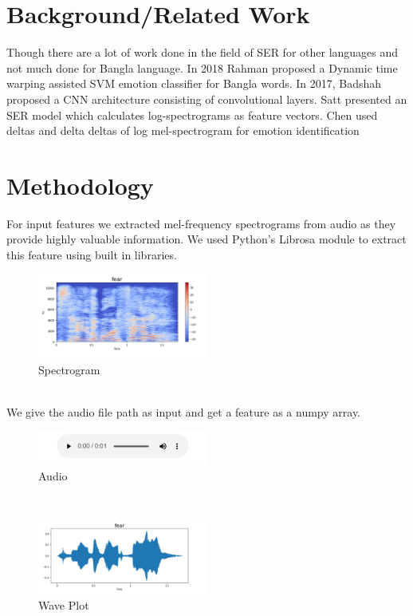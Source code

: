 \documentclass[a4paper, 12pt]{report}
\begin{document}
\section{Background/Related Work}
Though there are a lot of work done in the field of SER for other languages and not much done for Bangla language. In 2018 Rahman proposed a Dynamic time warping assisted SVM emotion classifier for Bangla words. \cite{rahman2018dynamic} In 2017, Badshah proposed a CNN architecture consisting of convolutional layers. \cite{badshah2017speech} Satt presented an SER model which calculates log-spectrograms as feature vectors. \cite{satt2017efficient} Chen used deltas and delta deltas of log mel-spectrogram for emotion identification \cite{chen20183}\\

\section{Methodology}
For input features we extracted mel-frequency spectrograms from audio as they provide highly valuable information. We used Python’s Librosa module to extract this feature using built in libraries.\\
\begin{figure}[h!]
\centering
\includegraphics[width=0.5\textwidth]{spectrogram}
\caption{Spectrogram}
\end{figure}\\
We give the audio file path as input and get a feature as a numpy array.\\
\begin{figure}[h!]
\centering
\includegraphics[width=0.5\textwidth]{audio}
\caption{Audio}
\end{figure}\\
\begin{figure}[h!]
\centering
\includegraphics[width=0.5\textwidth]{wave_plot}
\caption{Wave Plot}
\end{figure}
\end{document}
